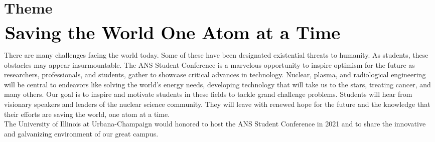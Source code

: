 \section{Theme}

$\Huge\textbf{Saving the World One Atom at a Time}$

There are many challenges facing the world today. Some of these have been designated existential threats to humanity. As students, these obstacles may appear insurmountable. The ANS Student Conference is a marvelous opportunity to inspire optimism for the future as researchers, professionals, and students, gather to showcase critical advances in technology. Nuclear, plasma, and radiological engineering will be central to endeavors like solving the world's energy needs, developing technology that will take us to the stars, treating cancer, and many others.  Our goal is to inspire and motivate students in these fields to tackle grand challenge problems. Students will hear from visionary speakers and leaders of the nuclear science community. They will leave with renewed hope for the future and the knowledge that their efforts are saving the world, one atom at a time.\\
The University of Illinois at Urbana-Champaign would honored to host the ANS Student Conference in 2021 and to share the innovative and galvanizing environment of our great campus. 